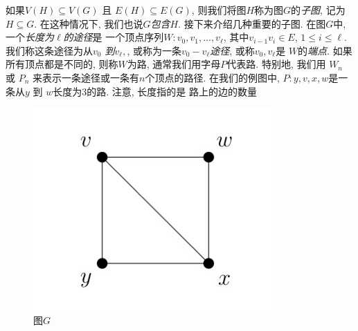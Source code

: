 \documentclass{ctexbook}
\begin{document}
如果$V(H) \subseteq V(G)$ 且 $E(H) \subseteq E(G) $, 则我们将图$H$称为图$G$的\textsl{子图}, 记为$H \subseteq G$.
在这种情况下, 我们也说$G$\textsl{包含}$H$. 接下来介绍几种重要的子图. 在图$G$中, 一个\textsl{长度为$\ell$的途径}是
一个顶点序列$W: v_{0}, v_{1}, \ldots, v_{\ell}$, 其中$v_{i-1} v_{i} \in E$, $1 \leqslant i \leqslant \ell $.
我们称这条途径为从\textsl{$v_{0}$ 到$v_{\ell},$}, 或称为一条\textsl{$v_{0}-v_{\ell}$途径}, 或称$v_{0}, v_{\ell}$是
$W$的\textsl{端点}. 如果所有顶点都是不同的, 则称$W$为路, 通常我们用字母$P$代表路. 特别地, 我们用 $W_{n}$ 或 $P_{n}$
来表示一条途径或一条有$n$个顶点的路径. 在我们的例图中, $P: y, v, x, w$是一条从$y$ 到 $w$长度为3的路. 注意, 长度指的是
路上的边的数量

\begin{figure}
    \centering
\includegraphics[scale=0.3]{./fig1/figure1.8.PNG}
    \caption{图$G$}
\end{figure}
\end{document}
